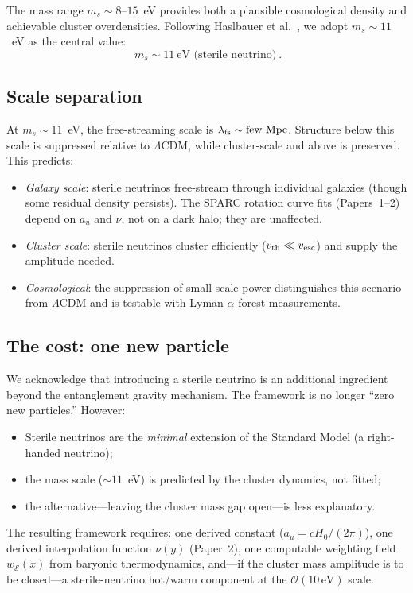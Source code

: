 \documentclass[aps,prd,twocolumn,superscriptaddress,nofootinbib]{revtex4-2}
\newcommand{\au}{a_u}
\newcommand{\wS}{w_{\mathcal{S}}}
\begin{document}
The mass range $m_s\sim 8$--$15$~eV provides both a plausible cosmological density and achievable cluster overdensities. Following Haslbauer et al.~\cite{Haslbauer2020}, we adopt $m_s\sim 11$~eV as the central value:
\begin{equation}
\boxed{\ m_s \sim 11~\text{eV (sterile neutrino)}\ }.
\label{eq:ms_prediction}
\end{equation}

\subsection{Scale separation}

At $m_s\sim 11$~eV, the free-streaming scale is $\lambda_{\rm fs}\sim\text{few Mpc}$. Structure below this scale is suppressed relative to $\Lambda$CDM, while cluster-scale and above is preserved. This predicts:
\begin{itemize}
\item \emph{Galaxy scale}: sterile neutrinos free-stream through individual galaxies (though some residual density persists). The SPARC rotation curve fits (Papers~1--2) depend on $\au$ and $\nu$, not on a dark halo; they are unaffected.
\item \emph{Cluster scale}: sterile neutrinos cluster efficiently ($v_{\rm th}\ll v_{\rm esc}$) and supply the amplitude needed.
\item \emph{Cosmological}: the suppression of small-scale power distinguishes this scenario from $\Lambda$CDM and is testable with Lyman-$\alpha$ forest measurements.
\end{itemize}

\subsection{The cost: one new particle}

We acknowledge that introducing a sterile neutrino is an additional ingredient beyond the entanglement gravity mechanism. The framework is no longer ``zero new particles.'' However:
\begin{itemize}
\item Sterile neutrinos are the \emph{minimal} extension of the Standard Model (a right-handed neutrino);
\item the mass scale ($\sim 11$~eV) is predicted by the cluster dynamics, not fitted;
\item the alternative---leaving the cluster mass gap open---is less explanatory.
\end{itemize}
The resulting framework requires: one derived constant ($\au=cH_0/(2\pi)$), one derived interpolation function $\nu(y)$ (Paper~2), one computable weighting field $\wS(x)$ from baryonic thermodynamics, and---if the cluster mass amplitude is to be closed---a sterile-neutrino hot/warm component at the $\mathcal{O}(10\,\mathrm{eV})$ scale.
\end{document}
